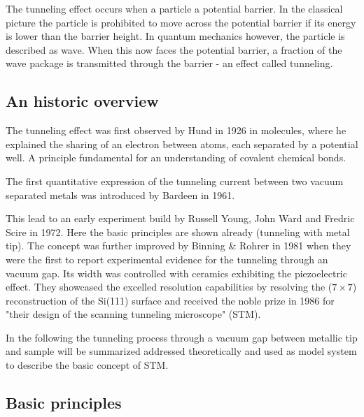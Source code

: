 The tunneling effect occurs when a particle a potential barrier. In the classical picture the particle is prohibited to move across the potential barrier if its energy is lower than the barrier height. In quantum mechanics however, the particle is described as wave. When this now faces the potential barrier, a fraction of the wave package is transmitted through the barrier - an effect called tunneling.

\subsection{An historic overview}
The tunneling effect was first observed by Hund in 1926 in molecules, where he explained the sharing of an electron between atoms, each separated by a potential well.\cite{Mehra_tunneling_1982} A principle fundamental for an understanding of covalent chemical bonds. 

The first quantitative expression of the tunneling current between two vacuum separated metals was introduced by Bardeen in 1961.\cite{Bardeen_tunneling_1961} 

This lead to an early experiment build by Russell Young, John Ward and Fredric Scire in 1972.\cite{Young_topographiner_1972} Here the basic principles are shown already (tunneling with metal tip). The concept was further improved by Binning \& Rohrer in 1981 \cite{binning_tunneling_1982} when they were the first to report experimental evidence for the tunneling through an vacuum gap. Its width was controlled with ceramics exhibiting the piezoelectric effect. They showcased the excelled resolution capabilities by resolving the ($7 \times 7$) reconstruction of the Si(111) surface \cite{binnig_1983} and received the noble prize in 1986 for "their design of the scanning tunneling microscope" (STM).\cite{_noble_price_1986} 

In the following the tunneling process through a vacuum gap between metallic tip and sample will be summarized addressed theoretically and used as model system to describe the basic concept of STM.

\subsection{Basic principles}

